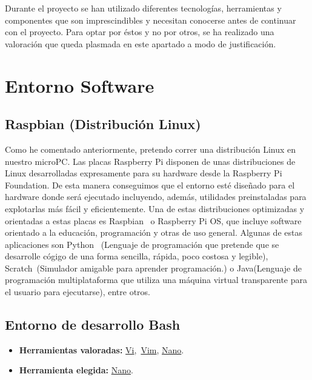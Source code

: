 
Durante el proyecto se han utilizado diferentes tecnologías, herramientas y componentes que son imprescindibles y necesitan conocerse antes de continuar con el proyecto. Para optar por éstos y no por otros, se ha realizado una valoración que queda plasmada en este apartado a modo de justificación.

\section{Entorno Software}
\subsection{Raspbian (Distribución Linux)}\label{4:RaspbianOS}
Como he comentado anteriormente, pretendo correr una distribución Linux en nuestro microPC. Las placas Raspberry Pi disponen de unas distribuciones de Linux desarrolladas expresamente para su hardware desde la Raspberry Pi Foundation. De esta manera conseguimos que el entorno esté diseñado para el hardware donde será ejecutado incluyendo, además, utilidades preinstaladas para explotarlas más fácil y eficientemente. Una de estas distribuciones optimizadas y orientadas a estas placas es Raspbian~\cite{misc:RbPWeb} o Raspberry Pi OS, que incluye software orientado a la educación, programación y otras de uso general. Algunas de estas aplicaciones son Python~\cite{misc:Python} (Lenguaje de programación que pretende que se desarrolle cógigo de una forma sencilla, rápida, poco costosa y legible), Scratch~\cite{misc:Scratch}(Simulador amigable para aprender programación.) o Java\cite{misc:Java}(Lenguaje de programación multiplataforma que utiliza una máquina virtual transparente para el usuario para ejecutarse), entre otros.

\subsection{Entorno de desarrollo Bash}\label{4:BASH}
\begin{itemize}
    \item \textbf{Herramientas valoradas:} \href{https://www.freebsd.org/cgi/man.cgi?query=vi&sektion=1}{Vi},~\href{https://www.vim.org/}{Vim}, \href{https://www.nano-editor.org/}{Nano}.
    \item \textbf{Herramienta elegida:} \href{https://www.nano-editor.org/}{Nano}.
\end{itemize}

